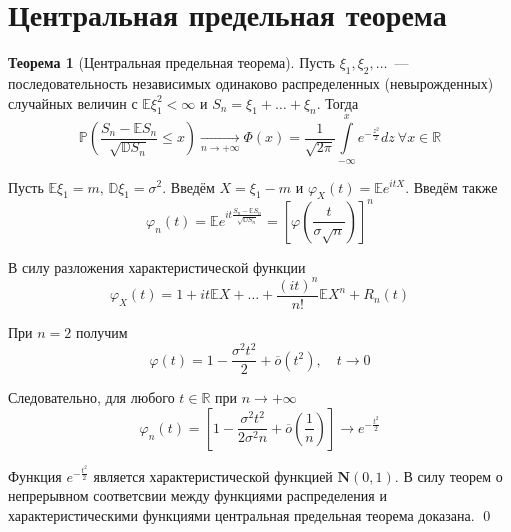 \documentclass[oneside,final,14pt]{extreport}
\renewenvironment{proof}{{\bfseries Доказательство.}}{\qed}
\theoremstyle{plain}
\theoremstyle{definition}
\theoremstyle{named}
\newtheorem*{namedthm}{Теорема}
\begin{document}
\section{Центральная предельная теорема}
\begin{namedthm}[Центральная предельная теорема]
    Пусть $\xi_{1}, \xi_{2}, \ldots$~--- последовательность независимых одинаково распределенных (невырожденных) случайных величин с $\mathbb{E} \xi_{1}^{2}<\infty$ и $S_{n}=\xi_{1}+\ldots+\xi_{n}$. Тогда
    \begin{equation*}
        \mathbb{P}\left(\frac{S_{n}-\mathbb{E} S_{n}}{\sqrt{\mathbb{D} S_{n}}} \leqslant x\right)
        \xrightarrow[n \to +\infty]{}
        \Phi(x) = \frac{1}{\sqrt{2 \pi}} \int\limits_{-\infty}^{x} e^{-\frac{z^{2}}{2}} dz~ \forall x \in \mathbb{R}
    \end{equation*}
\end{namedthm}
\begin{proof}
Пусть $\mathbb{E} \xi_{1}=m,\, \mathbb{D} \xi_{1}=\sigma^{2}$. Введём $X = \xi_1 - m$ и $\varphi_X(t)=\mathbb{E} e^{i tX}$. Введём также
\begin{equation*}
    \varphi_{n}(t)=\mathbb{E} e^{i t \frac{S_{n}-\mathbb{E} S_{n}}{\sqrt{\mathbb{D} S_{n}}}} = 
    \left[\varphi\left(\frac{t}{\sigma \sqrt{n}}\right)\right]^{n}
\end{equation*}

В силу разложения характеристической функции
\begin{equation*}
    \varphi_{X}(t)=1+i t \mathbb{E} X+\ldots+\frac{(i t)^{n}}{n !} \mathbb{E} X^{n}+R_{n}(t)
\end{equation*}

При $n=2$ получим 
\begin{equation*}
    \varphi(t)=1-\frac{\sigma^{2} t^{2}}{2}+\overline{o}\left(t^{2}\right), \quad t \rightarrow 0
\end{equation*}

Следовательно, для любого $t \in \mathbb{R}$ при $n \to +\infty$
\begin{equation*}
    \varphi_{n}(t)=\left[1-\frac{\sigma^{2} t^{2}}{2 \sigma^{2} n}+\overline{o}\left(\frac{1}{n}\right)\right] \rightarrow e^{-\frac{t^{2}}{2}}
\end{equation*}

Функция $e^{-\frac{t^{2}}{2}}$ является характеристической функцией $\mathbf{N}(0,1)$. В силу теорем о непрерывном соответсвии между функциями распределения и характеристическими функциями центральная предельная теорема доказана.
\end{proof}
\end{document}
